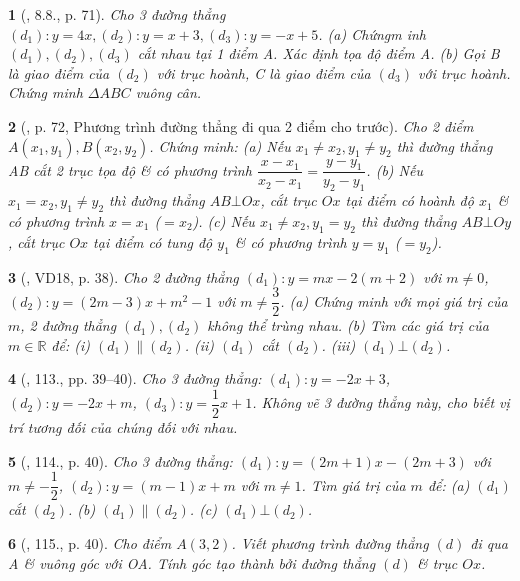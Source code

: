 \documentclass{article}
\newtheorem{baitoan}{}
\begin{document}
\begin{baitoan}[\cite{Binh_boi_duong_Toan_9_tap_1}, 8.8., p. 71]
	Cho 3 đường thẳng $(d_1):y = 4x,(d_2):y = x + 3,(d_3):y = -x + 5$. (a) Chứngm inh $(d_1),(d_2),(d_3)$ cắt nhau tại 1 điểm A. Xác định tọa độ điểm A. (b) Gọi B là giao điểm của $(d_2)$ với trục hoành, C là giao điểm của $(d_3)$ với trục hoành. Chứng minh $\Delta ABC$ vuông cân.
\end{baitoan}

\begin{baitoan}[\cite{Binh_boi_duong_Toan_9_tap_1}, p. 72, Phương trình đường thẳng đi qua 2 điểm cho trước]
	Cho 2 điểm $A(x_1,y_1),B(x_2,y_2)$. Chứng minh: (a) Nếu $x_1\ne x_2,y_1\ne y_2$ thì đường thẳng AB cắt 2 trục tọa độ \& có phương trình $\dfrac{x - x_1}{x_2 - x_1} = \dfrac{y - y_1}{y_2 - y_1}$. (b) Nếu $x_1 = x_2,y_1\ne y_2$ thì đường thẳng $AB\bot Ox$, cắt trục $Ox$ tại điểm có hoành độ $x_1$ \& có phương trình $x = x_1$ ($= x_2$). (c) Nếu $x_1\ne x_2,y_1 = y_2$ thì đường thẳng $AB\bot Oy$, cắt trục $Ox$ tại điểm có tung độ $y_1$ \& có phương trình $y = y_1$ ($= y_2$).
\end{baitoan}

\begin{baitoan}[\cite{Tuyen_Toan_9_old}, VD18, p. 38]
	Cho 2 đường thẳng $(d_1):y = mx - 2(m + 2)$ với $m\ne0$, $(d_2):y = (2m - 3)x + m^2 - 1$ với $m\ne\dfrac{3}{2}$. (a) Chứng minh với mọi giá trị của $m$, 2 đường thẳng $(d_1),(d_2)$ không thể trùng nhau. (b) Tìm các giá trị của $m\in\mathbb{R}$ để: (i) $(d_1)\parallel(d_2)$. (ii) $(d_1)$ cắt $(d_2)$. (iii) $(d_1)\bot(d_2)$.
\end{baitoan}

\begin{baitoan}[\cite{Tuyen_Toan_9_old}, 113., pp. 39--40]
	Cho 3 đường thẳng: $(d_1):y = -2x + 3$, $(d_2):y = -2x + m$, $(d_3):y = \dfrac{1}{2}x + 1$. Không vẽ 3 đường thẳng này, cho biết vị trí tương đối của chúng đối với nhau.
\end{baitoan}

\begin{baitoan}[\cite{Tuyen_Toan_9_old}, 114., p. 40]
	Cho 3 đường thẳng: $(d_1):y = (2m + 1)x - (2m + 3)$ với $m\ne-\dfrac{1}{2}$, $(d_2):y = (m - 1)x + m$ với $m\ne1$. Tìm giá trị của $m$ để: (a) $(d_1)$ cắt $(d_2)$. (b) $(d_1)\parallel(d_2)$. (c) $(d_1)\bot(d_2)$.
\end{baitoan}

\begin{baitoan}[\cite{Tuyen_Toan_9_old}, 115., p. 40]
	Cho điểm $A(3,2)$. Viết phương trình đường thẳng $(d)$ đi qua A \& vuông góc với OA. Tính góc tạo thành bởi đường thẳng $(d)$ \& trục $Ox$.
\end{baitoan}
\end{document}
